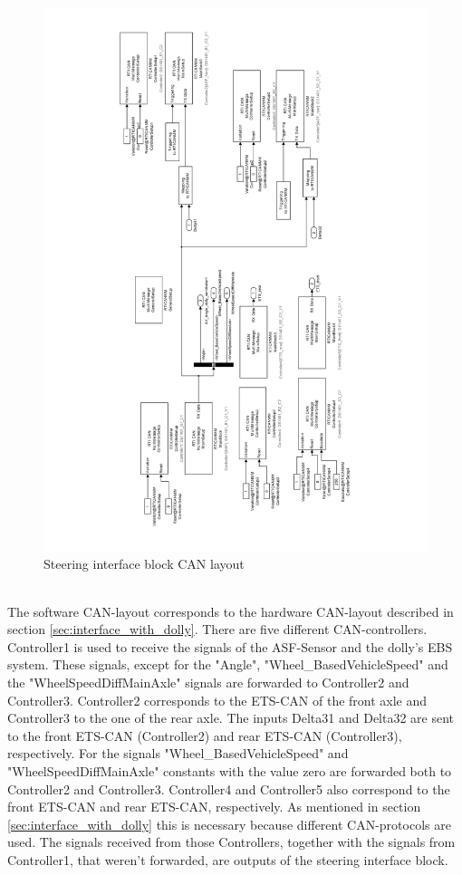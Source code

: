 \documentclass[ExampleMasters.tex]{subfiles}
\begin{document}
 \begin{figure}[!htb]
 	\centering
 	\includegraphics[width=1\linewidth]{figures/steering_interface_inside}
 	
 	\caption{Steering interface block \gls{CAN} layout}
 	\label{fig:steering_interface_inside_pdf}
 \end{figure} \\
 
 The software CAN-layout corresponds to the hardware CAN-layout described in section \ref{sec:interface_with_dolly}. There are five different CAN-controllers. Controller1 is used to receive the signals of the ASF-Sensor and the dolly's \gls{EBS} system. These signals, except for the "Angle", "Wheel\_BasedVehicleSpeed" and the "WheelSpeedDiffMainAxle" signals are forwarded to Controller2 and Controller3. Controller2 corresponds to the \gls{ETS}-\gls{CAN} of the front axle and Controller3 to the one of the rear axle. The inputs Delta31 and Delta32 are sent to the front \gls{ETS}-\gls{CAN} (Controller2) and rear \gls{ETS}-\gls{CAN} (Controller3), respectively. For the signals "Wheel\_BasedVehicleSpeed" and  "WheelSpeedDiffMainAxle" constants with the value zero are forwarded both to Controller2 and Controller3.
 Controller4 and Controller5 also correspond to the front \gls{ETS}-\gls{CAN} and rear \gls{ETS}-\gls{CAN}, respectively. As mentioned in section \ref{sec:interface_with_dolly} this is necessary because different CAN-protocols are used. The signals received from those Controllers, together with the signals from Controller1, that weren't forwarded, are outputs of the steering interface block.
  
\end{document}
